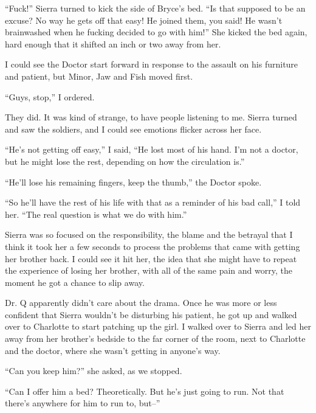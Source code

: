 ``Fuck!''  Sierra turned to kick the side of Bryce's bed. ``Is that supposed to be an excuse?  No way he gets off that easy!  He joined them, you said!  He wasn't brainwashed when he fucking decided to go with him!''  She kicked the bed again, hard enough that it shifted an inch or two away from her.



I could see the Doctor start forward in response to the assault on his furniture and patient, but Minor, Jaw and Fish moved first.



``Guys, stop,'' I ordered.



They did.  It was kind of strange, to have people listening to me.  Sierra turned and saw the soldiers, and I could see emotions flicker across her face.



``He's not getting off easy,'' I said, ``He lost most of his hand.  I'm not a doctor, but he might lose the rest, depending on how the circulation is.''



``He'll lose his remaining fingers, keep the thumb,'' the Doctor spoke.



``So he'll have the rest of his life with that as a reminder of his bad call,'' I told her.  ``The real question is what we do with him.''



Sierra was so focused on the responsibility, the blame and the betrayal that I think it took her a few seconds to process the problems that came with getting her brother back.  I could see it hit her, the idea that she might have to repeat the experience of losing her brother, with all of the same pain and worry, the moment he got a chance to slip away.



Dr. Q apparently didn't care about the drama.  Once he was more or less confident that Sierra wouldn't be disturbing his patient, he got up and walked over to Charlotte to start patching up the girl.  I walked over to Sierra and led her away from her brother's bedside to the far corner of the room, next to Charlotte and the doctor, where she wasn't getting in anyone's way.



``Can you keep him?'' she asked, as we stopped.



``Can I offer him a bed?  Theoretically.  But he's just going to run.  Not that there's anywhere for him to run to, but--''



